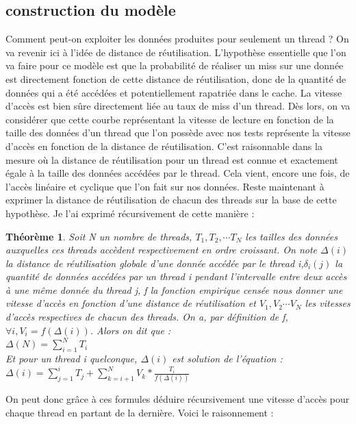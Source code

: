 \documentclass{report}
\begin{document}
\subsection{construction du modèle}
Comment peut-on exploiter les données produites pour seulement un thread ? On va revenir
ici à l'idée de distance de réutilisation. L'hypothèse essentielle que l'on va faire 
pour ce modèle est que la probabilité de réaliser un miss sur une donnée est directement
fonction de cette distance de réutilisation, donc de la quantité de données qui a été
accédées et potentiellement rapatriée dans le cache. La vitesse d'accès est bien sûre
directement liée au taux de miss d'un thread. Dès lors, on va considérer que cette 
courbe représentant la vitesse de lecture en fonction de la taille des données d'un thread 
que l'on possède avec nos tests représente la vitesse d'accès en fonction de la distance
de réutilisation. C'est raisonnable dans la mesure où la distance de réutilisation
pour un thread est connue et exactement égale à la taille des données accédées par le
thread. Cela vient, encore une fois, de l'accès linéaire et cyclique que l'on fait sur
nos données. Reste maintenant à exprimer la distance de réutilisation de chacun des threads sur la 
base de cette hypothèse. Je l'ai exprimé récursivement de cette manière : 
\newtheorem{th3}{Théorème}
\begin{th3}
Soit N un nombre de threads, $T_1, T_2, \cdots T_N$ les tailles des données auxquelles ces threads
accèdent respectivement en ordre croissant. On note $\Delta(i)$ la distance de réutilisation globale 
d'une donnée accédée par le thread i,$\delta_i(j)$ la quantité de données accédées par un thread i
pendant l'intervalle entre deux accès à une même donnée du thread j, f la fonction empirique censée 
nous donner une vitesse d'accès en fonction d'une distance de réutilisation et $V_1, V_2 \cdots V_N$ 
les vitesses d'accès respectives de chacun des threads. On a, par définition de f, $\forall 
i, V_i = f(\Delta(i))$. Alors on dit que :
\\$\Delta(N)= \sum_{i=1}^{N}{T_{i}}$
\\Et pour un thread i quelconque, $\Delta(i)$ est solution de l'équation : 
\\$\Delta(i)= \sum_{j=1}^{i}{T_{j}} + \sum_{k=i+1}^{N}{V_k} * \frac{T_i} {f(\Delta(i))}$
\end{th3}
On peut donc grâce à ces formules déduire récursivement une vitesse d'accès pour chaque thread en
partant de la dernière. Voici le raisonnement :
\end{document}
